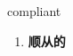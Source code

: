 
\begin{frame}
{\huge compliant}
\begin{center}
\begin{enumerate}\Large
  \item \textbf{顺从的}
\end{enumerate}
\end{center}
\end{frame}
